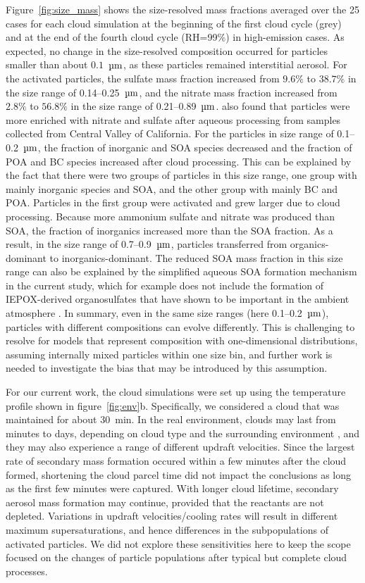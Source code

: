 \documentclass[edeposit,fullpage]{uiucthesis2009}
\begin{document}
Figure~\ref{fig:size_mass} shows the size-resolved mass fractions
averaged over the 25 cases for each cloud simulation at the beginning
of the first cloud cycle (grey) and at the end of the fourth cloud
cycle (RH=99\%) in high-emission cases.  As expected, no change in the
size-resolved composition occurred for particles smaller than about
$0.1$~$\rm \mu m$, as these particles remained interstitial
aerosol. For the activated particles, the sulfate mass fraction
increased from $9.6\%$ to $38.7\%$ in the size range of
0.14--0.25~$\rm \mu m$, and the nitrate mass fraction increased from
$2.8\%$ to $56.8\%$ in the size range of 0.21--0.89~$\rm \mu
m$. \citet{ge2012effect} also found that particles were more
  enriched with nitrate and sulfate after aqueous processing from 
  samples collected from Central Valley of California. For the
particles in size range of 0.1--0.2~$\rm \mu m$, the fraction of
inorganic and SOA species decreased and the fraction of POA and BC
species increased after cloud processing. This can be explained by the
fact that there were two groups of particles in this size range, one
group with mainly inorganic species and SOA, and the other group with
mainly BC and POA. Particles in the first group were activated and
grew larger due to cloud processing. Because more ammonium sulfate and
nitrate was produced than SOA, the fraction of inorganics increased
more than the SOA fraction. As a result, in the size range of
0.7--0.9~$\rm \mu m$, particles transferred from organics-dominant to
inorganics-dominant. The reduced SOA mass fraction in this size
  range can also be explained by the simplified aqueous SOA formation
  mechanism in the current study, which for example does not include
  the formation of IEPOX-derived organosulfates that have shown to be
  important in the ambient atmosphere \citep{hatch2011measurements}.
In summary, even in the same size ranges (here 0.1--0.2~$\rm \mu m$),
particles with different compositions can evolve differently. This is
challenging to resolve for models that represent composition with
one-dimensional distributions, assuming internally mixed particles
within one size bin, and further work is needed to investigate
  the bias that may be introduced by this assumption.

For our current work, the cloud simulations were set up using the
temperature profile shown in figure~\ref{fig:env}b. Specifically, we
considered a cloud that was maintained for about 30~min. In the real
environment, clouds may last from minutes to days, depending on cloud
type and the surrounding environment \citep{Cotton2011}, and they may
also experience a range of different updraft velocities. Since the
largest rate of secondary mass formation occured within a few minutes
after the cloud formed, shortening the cloud parcel time did not
impact the conclusions as long as the first few minutes were
captured. With longer cloud lifetime, secondary aerosol mass formation
may continue, provided that the reactants are not depleted. Variations
in updraft velocities/cooling rates will result in different maximum
supersaturations, and hence differences in the subpopulations of
activated particles. We did not explore these sensitivities here to
keep the scope focused on the changes of particle populations after
typical but complete cloud processes.
\end{document}
